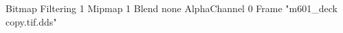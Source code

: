 {Bitmap
	{Filtering 1}
	{Mipmap 1}
	{Blend none}
	{AlphaChannel 0}
	{Frame "m601_deck copy.tif.dds"}
}
